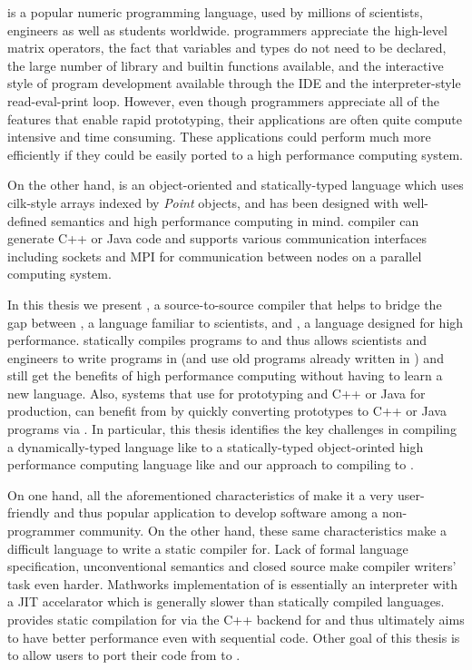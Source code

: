 \matlab is a popular numeric programming language, used by millions of
scientists, engineers as well as students worldwide\cite{MatlabGrowth}.  \matlab
programmers appreciate the high-level matrix operators,  the fact that
variables and types do not need to be declared, the large number of library and
builtin functions available, and the interactive style of program development
available through the IDE and the interpreter-style read-eval-print loop.
However, even though \matlab programmers appreciate all of the features that
enable rapid prototyping,  their applications are often quite compute intensive
and time consuming. These applications could perform much more efficiently if
they could be easily ported to a high performance computing system.  

On the other hand, \xten is an object-oriented and statically-typed language
which uses cilk-style arrays indexed by \emph{Point} objects, and has been
designed with well-defined semantics and high performance computing in mind.
\xten compiler can generate C++ or Java code and supports various communication
interfaces including sockets and MPI for communication between nodes on a
parallel computing system.

In this thesis we present \mixten, a source-to-source compiler that helps
to bridge the gap between \matlab, a language familiar to scientists,
and \xten,  a language designed for high performance. \mixten statically
compiles \matlab programs to \xten and thus
allows scientists and engineers to write programs in \matlab (and use old 
programs already written in \matlab) and still get the benefits of high 
performance computing without having to learn a new language. Also, systems that
use \matlab for prototyping and C++ or Java for production, can benefit from
\mixten by quickly converting \matlab prototypes to C++ or Java programs via 
\xten. In particular, this thesis identifies the key challenges in compiling a
dynamically-typed language like \matlab to a statically-typed object-orinted
high performance computing language like \xten and our approach to 
compiling \matlab to \xten.
\begin{comment}
INSERT PIC
compilation flow
\end{comment}

On one hand, all the aforementioned characteristics of \matlab make it a very 
user-friendly and thus popular application to develop software among a
non-programmer community. On the other hand, these same characteristics make
\matlab a difficult language to write a static compiler for. Lack of formal 
language specification, unconventional semantics and closed source make compiler
writers' task even harder. Mathworks implementation of \matlab is essentially an
interpreter with a JIT accelarator which is generally slower than statically
compiled languages. \mixten provides static compilation for \matlab via the C++
backend for \xten and thus ultimately aims to have better performance even with
sequential code. Other goal of this thesis is to allow users to port their code
from \matlab to \xten.    


